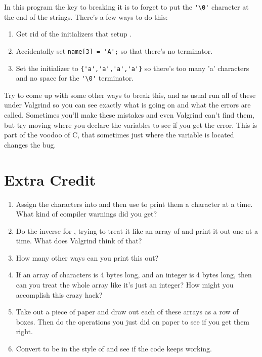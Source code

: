 In this program the key to breaking it is to forget to put the \verb|'\0'|
character at the end of the strings.  There's a few ways to do this:

\begin{enumerate}
\item Get rid of the initializers that setup .
\item Accidentally set \verb|name[3] = 'A';| so that there's no terminator.
\item Set the initializer to \verb|{'a','a','a','a'}| so there's too many
    'a' characters and no space for the \verb|'\0'| terminator.
\end{enumerate}

Try to come up with some other ways to break this, and as usual run all of
these under Valgrind so you can see exactly what is going on and what the
errors are called.  Sometimes you'll make these mistakes and even
Valgrind can't find them, but try moving where you declare the variables
to see if you get the error.  This is part of the voodoo of C, that
sometimes just where the variable is located changes the bug.

\section{Extra Credit}

\begin{enumerate}
\item Assign the characters into  and then use 
    to print them a character at a time.  What kind of compiler warnings 
    did you get?
\item Do the inverse for , trying to treat it like an array
    of  and print it out one  at a time.  What
    does Valgrind think of that?
\item How many other ways can you print this out?
\item If an array of characters is 4 bytes long, and an integer is 4 bytes
    long, then can you treat the whole  array like it's just
    an integer?  How might you accomplish this crazy hack?
\item Take out a piece of paper and draw out each of these arrays as a
    row of boxes. Then do the operations you just did on paper to see
    if you get them right.
\item Convert  to be in the style of  and see
    if the code keeps working.
\end{enumerate}


